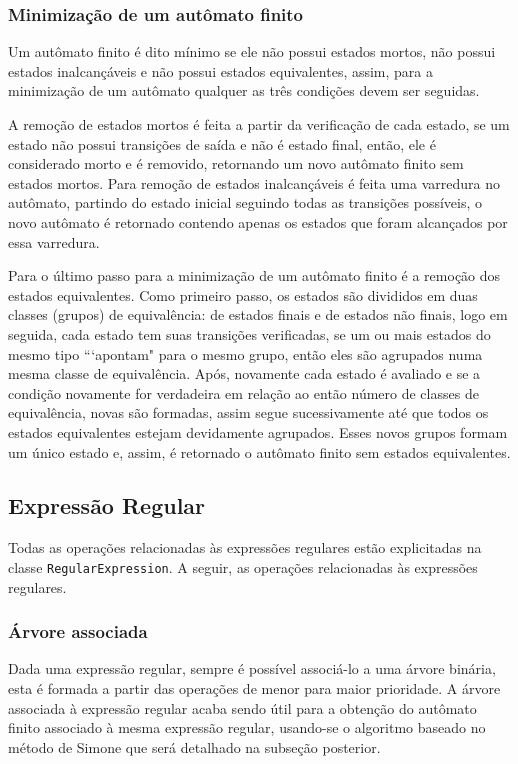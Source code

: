 \documentclass{article}
\begin{document}
        \subsubsection{Minimização de um autômato finito}
            Um autômato finito é dito mínimo se ele não possui estados mortos,
            não possui estados inalcançáveis e não possui estados equivalentes,
            assim, para a minimização de um autômato qualquer as três condições
            devem ser seguidas.

            A remoção de estados mortos é feita a partir da verificação de cada
            estado, se um estado não possui transições de saída e não é estado
            final, então, ele é considerado morto e é removido, retornando um
            novo autômato finito sem estados mortos. Para remoção de estados
            inalcançáveis é feita uma varredura no autômato, partindo do estado
            inicial seguindo todas as transições possíveis, o novo autômato é
            retornado contendo apenas os estados que foram alcançados por essa
            varredura.

            Para o último passo para a minimização de um autômato finito é a
            remoção dos estados equivalentes. Como primeiro passo, os estados
            são divididos em duas classes (grupos) de equivalência: de estados
            finais e de estados não finais, logo em seguida, cada estado tem
            suas transições verificadas, se um ou mais estados do mesmo tipo
            ```apontam" para o mesmo grupo, então eles são agrupados numa mesma
            classe de equivalência. Após, novamente cada estado é avaliado e se
            a condição novamente for verdadeira em relação ao então número de
            classes de equivalência, novas são formadas, assim segue
            sucessivamente até que todos os estados equivalentes estejam
            devidamente agrupados. Esses novos grupos formam um único estado e,
            assim, é retornado o autômato finito sem estados equivalentes.

    \subsection{Expressão Regular}
        Todas as operações relacionadas às expressões regulares estão
        explicitadas na classe \texttt{RegularExpression}. A seguir, as
        operações relacionadas às expressões regulares.

        \subsubsection{Árvore associada}
            Dada uma expressão regular, sempre é possível associá-lo a uma
            árvore binária, esta é formada a partir das operações de menor para
            maior prioridade. A árvore associada à expressão regular acaba
            sendo útil para a obtenção do autômato finito associado à mesma
            expressão regular, usando-se o algoritmo baseado no método de
            Simone que será detalhado na subseção posterior.
\end{document}
